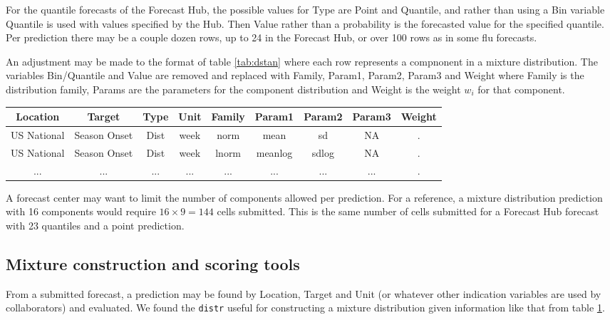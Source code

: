 \documentclass{article}\usepackage[]{graphicx}\usepackage[]{color}
\begin{document}
For the quantile forecasts of the Forecast Hub, the possible values for Type 
are Point and Quantile, and rather than using a Bin variable Quantile is used
with values specified by the Hub. Then Value rather than a probability is the
forecasted value for the specified quantile. Per prediction there may be a 
couple dozen rows, up to 24 in the Forecast Hub, or over 100 rows as in some
flu forecasts. 

An adjustment may be made to the format of table \ref{tab:dstan} where each row
represents a compnonent in a mixture distribution.
The variables Bin/Quantile and Value are removed and replaced with Family,
Param1, Param2, Param3 and Weight where Family is the distribution family,
Params are the parameters for the component distribution and Weight is the 
weight $w_i$ for that component.

\begin{table}[h!]
\label{tab:mstan}
\centering
 \begin{tabular}{|c|c|c|c|c|c|c|c|c|}
 \hline
    Location & Target & Type & Unit & Family & Param1 & Param2 & Param3 & Weight
    \\ \hline
    US National & Season Onset & Dist & week & norm & mean & sd & NA & .  \\
    US National & Season Onset & Dist & week & lnorm & meanlog & sdlog & NA & . \\
    ... & ... & ... & ... & ... & ... & ... & ... & .\\
 \hline
 \end{tabular}
\end{table}

A forecast center may want to limit the number of components allowed per 
prediction. For a reference, a mixture distribution prediction with 16 
components would require $16 \times 9 = 144$ cells submitted. This is the same 
number of cells
submitted for a Forecast Hub forecast with 23 quantiles and a point prediction.

\subsection{Mixture construction and scoring tools}

From a submitted forecast, a prediction may be found by Location, Target and 
Unit (or whatever other indication variables are used by collaborators) and 
evaluated. We found
the \texttt{distr} \cite{camphausen2007distr}
useful for constructing a mixture distribution given
information like that from table \ref{tab:mstan}. 
\end{document}
